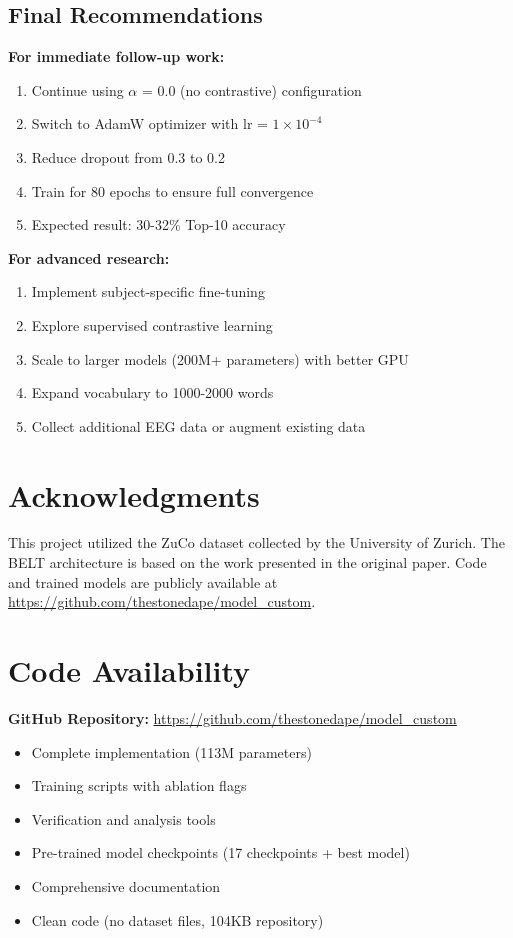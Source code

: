 \documentclass[12pt,a4paper]{article}
\begin{document}
\subsection{Final Recommendations}

\textbf{For immediate follow-up work:}
\begin{enumerate}
    \item Continue using $\alpha$ = 0.0 (no contrastive) configuration
    \item Switch to AdamW optimizer with lr = $1 \times 10^{-4}$
    \item Reduce dropout from 0.3 to 0.2
    \item Train for 80 epochs to ensure full convergence
    \item Expected result: 30-32\% Top-10 accuracy
\end{enumerate}

\textbf{For advanced research:}
\begin{enumerate}
    \item Implement subject-specific fine-tuning
    \item Explore supervised contrastive learning
    \item Scale to larger models (200M+ parameters) with better GPU
    \item Expand vocabulary to 1000-2000 words
    \item Collect additional EEG data or augment existing data
\end{enumerate}

\section*{Acknowledgments}

This project utilized the ZuCo dataset collected by the University of Zurich. The BELT architecture is based on the work presented in the original paper. Code and trained models are publicly available at \url{https://github.com/thestonedape/model\_custom}.

\section*{Code Availability}

\textbf{GitHub Repository:} \url{https://github.com/thestonedape/model\_custom}

\begin{itemize}
    \item Complete implementation (113M parameters)
    \item Training scripts with ablation flags
    \item Verification and analysis tools
    \item Pre-trained model checkpoints (17 checkpoints + best model)
    \item Comprehensive documentation
    \item Clean code (no dataset files, 104KB repository)
\end{itemize}
\end{document}
